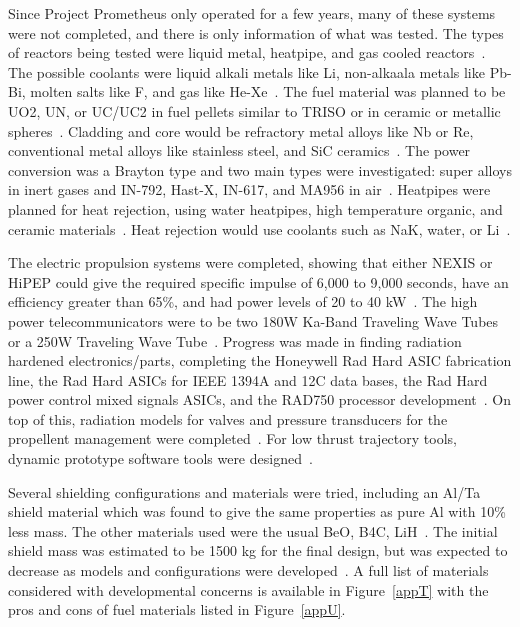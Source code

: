 \documentclass{article}
\begin{document}
Since Project Prometheus only operated for a few years, many of these systems were not completed, and there is only information of what was tested. The types of reactors being tested were liquid metal, heatpipe, and gas cooled reactors~\cite{wollman2006prometheus}. The possible coolants were liquid alkali metals like Li, non-alkaala metals like Pb-Bi, molten salts like F, and gas like He-Xe~\cite{wollman2006prometheus}. The fuel material was planned to be UO2, UN, or UC/UC2 in fuel pellets similar to TRISO or in ceramic or metallic spheres~\cite{wollman2006prometheus}. Cladding and core would be refractory metal alloys like Nb or Re, conventional metal alloys like stainless steel, and SiC ceramics~\cite{wollman2006prometheus}. The power conversion was a Brayton type and two main types were investigated: super alloys in inert gases and IN-792, Hast-X, IN-617, and MA956 in air~\cite{taylor2005prometheus}. Heatpipes were planned for heat rejection, using water heatpipes, high temperature organic, and ceramic materials~\cite{taylor2005prometheus}. Heat rejection would use coolants such as NaK, water, or Li~\cite{wollman2006prometheus}.


    The electric propulsion systems were completed, showing that either NEXIS or HiPEP could give the required specific impulse of 6,000 to 9,000 seconds, have an efficiency greater than 65\%, and had power levels of 20 to 40 kW~\cite{taylor2005prometheus}. The high power telecommunicators were to be two 180W Ka-Band Traveling Wave Tubes or a 250W Traveling Wave Tube~\cite{taylor2005prometheus}. Progress was made in finding radiation hardened electronics/parts, completing the Honeywell Rad Hard ASIC fabrication line, the Rad Hard ASICs for IEEE 1394A and 12C data bases, the Rad Hard power control mixed signals ASICs, and the RAD750 processor development~\cite{taylor2005prometheus}. On top of this, radiation models for valves and pressure transducers for the propellent management were completed~\cite{taylor2005prometheus}. For low thrust trajectory tools, dynamic prototype software tools were designed~\cite{taylor2005prometheus}.


    Several shielding configurations and materials were tried, including an Al/Ta shield material which was found to give the same properties as pure Al with 10\% less mass. The other materials used were the usual BeO, B4C, LiH~\cite{wollman2006prometheus}. The initial shield mass was estimated to be 1500 kg for the final design, but was expected to decrease as models and configurations were developed~\cite{taylor2005prometheus}. A full list of materials considered with developmental concerns is available in Figure~\ref{appT} with the pros and cons of fuel materials listed in Figure~\ref{appU}. 
\end{document}
